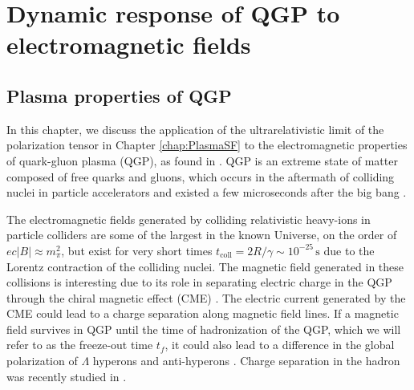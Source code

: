 \section{Dynamic response of QGP to electromagnetic fields}\label{chap:QCD}
\subsection{Plasma properties of QGP}

In this chapter, we discuss the application of the ultrarelativistic limit of the polarization tensor in Chapter \ref{chap:PlasmaSF} to the electromagnetic properties of quark-gluon plasma (QGP), as found in \cite{Grayson:2022asf}. QGP is an extreme state of matter composed of free quarks and gluons, which occurs in the aftermath of colliding nuclei in particle accelerators and existed a few microseconds after the big bang \cite{Letessier:2002ony}. 

The electromagnetic fields generated by colliding relativistic heavy-ions in particle colliders are some of the largest in the known Universe, on the order of $ec|B| \approx m_\pi^2$, but exist for very short times $t_{\text{coll}}= 2 R/\gamma \sim 10^{-25}\,\textrm{s}$ due to the Lorentz contraction of the colliding nuclei. The magnetic field generated in these collisions is interesting due to its role in separating electric charge in the QGP through the chiral magnetic effect (CME) \cite{Kharzeev:2007jp}. The electric current generated by the CME could lead to a charge separation along magnetic field lines. If a magnetic field survives in QGP until the time of hadronization of the QGP, which we will refer to as the freeze-out time $t_f$, it could also lead to a difference in the global polarization of $\Lambda$ hyperons and anti-hyperons \cite{Muller:2018ibh}. Charge separation in the hadron was recently studied in \cite{STAR:2023jdd}. 

